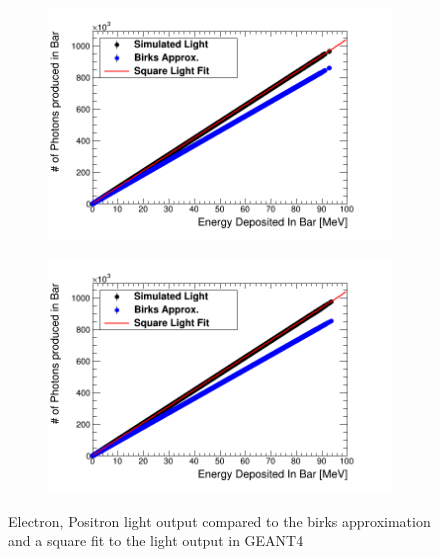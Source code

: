 \begin{figure}[!h]
\centering
\begin{subfigure}{.5\textwidth}
  \centering
  \includegraphics[width=\linewidth]{Chapter4/Figs/e-BirksSlab_simAndApproxLight.png}
  \captionsetup{width=.9\linewidth}
  \caption{}
  \label{subFig:electron_light}
\end{subfigure}%
\begin{subfigure}{.5\textwidth}
  \centering
  \includegraphics[width=\linewidth]{Chapter4/Figs/e+BirksSlab_simAndApproxLight.png}
  \captionsetup{width=.9\linewidth}
  \caption{}
  \label{subFig:positron_light}
\end{subfigure}
\caption{Electron, Positron light output compared to the birks approximation and a square fit to the light output in GEANT4}
\label{fig:electron_positron_light}
\end{figure}

